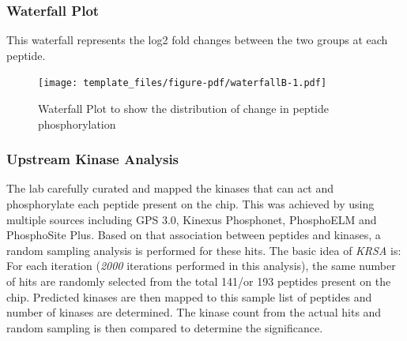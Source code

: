 \documentclass[
  letterpaper,
  DIV=11,
  numbers=noendperiod]{scrreport}
\begin{document}
\hypertarget{waterfall-plot-1}{%
\subsubsection{Waterfall Plot}\label{waterfall-plot-1}}

This waterfall represents the log2 fold changes between the two groups
at each peptide.

\begin{figure}[htbp]

{\centering \texttt{[image: template\_files/figure-pdf/waterfallB-1.pdf]}

}

\caption{Waterfall Plot to show the distribution of change in peptide
phosphorylation}

\end{figure}

\hypertarget{upstream-kinase-analysis-1}{%
\subsubsection{Upstream Kinase
Analysis}\label{upstream-kinase-analysis-1}}

The lab carefully curated and mapped the kinases that can act and
phosphorylate each peptide present on the chip. This was achieved by
using multiple sources including GPS 3.0, Kinexus Phosphonet, PhosphoELM
and PhosphoSite Plus. Based on that association between peptides and
kinases, a random sampling analysis is performed for these hits. The
basic idea of \emph{KRSA} is: For each iteration (\emph{2000} iterations
performed in this analysis), the same number of hits are randomly
selected from the total 141/or 193 peptides present on the chip.
Predicted kinases are then mapped to this sample list of peptides and
number of kinases are determined. The kinase count from the actual hits
and random sampling is then compared to determine the significance.
\end{document}
